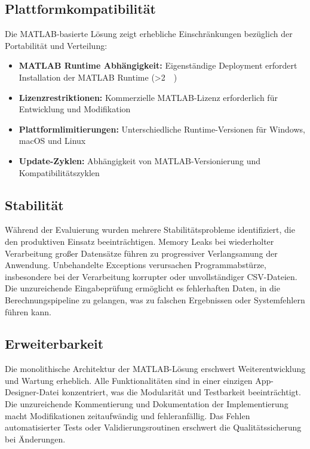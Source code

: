 \subsection{Plattformkompatibilität}

Die MATLAB-basierte Lösung zeigt erhebliche Einschränkungen bezüglich der Portabilität und Verteilung:

\begin{itemize}
    \item \textbf{MATLAB Runtime Abhängigkeit:} Eigenständige Deployment erfordert Installation der MATLAB Runtime (\SI{>2}{\giga\byte})
    \item \textbf{Lizenzrestriktionen:} Kommerzielle MATLAB-Lizenz erforderlich für Entwicklung und Modifikation
    \item \textbf{Plattformlimitierungen:} Unterschiedliche Runtime-Versionen für Windows, macOS und Linux
    \item \textbf{Update-Zyklen:} Abhängigkeit von MATLAB-Versionierung und Kompatibilitätszyklen
\end{itemize}

\subsection{Stabilität}

Während der Evaluierung wurden mehrere Stabilitätsprobleme identifiziert, die den produktiven Einsatz beeinträchtigen. Memory Leaks bei wiederholter Verarbeitung großer Datensätze führen zu progressiver Verlangsamung der Anwendung. Unbehandelte Exceptions verursachen Programmabstürze, insbesondere bei der Verarbeitung korrupter oder unvollständiger CSV-Dateien. Die unzureichende Eingabeprüfung ermöglicht es fehlerhaften Daten, in die Berechnungspipeline zu gelangen, was zu falschen Ergebnissen oder Systemfehlern führen kann.

\subsection{Erweiterbarkeit}

Die monolithische Architektur der MATLAB-Lösung erschwert Weiterentwicklung und Wartung erheblich. Alle Funktionalitäten sind in einer einzigen App-Designer-Datei konzentriert, was die Modularität und Testbarkeit beeinträchtigt. Die unzureichende Kommentierung und Dokumentation der Implementierung macht Modifikationen zeitaufwändig und fehleranfällig. Das Fehlen automatisierter Tests oder Validierungsroutinen erschwert die Qualitätssicherung bei Änderungen.

